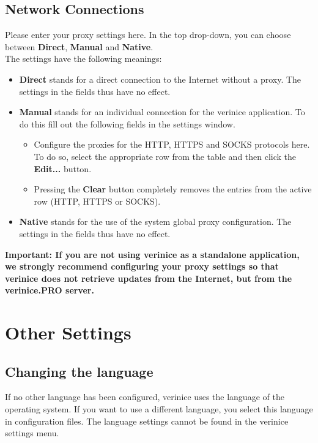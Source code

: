 \documentclass[a4paper,10pt]{book}
\begin{document}
\section{Network Connections}
Please enter your proxy settings here. In the top drop-down, you can choose between \textbf{Direct}, \textbf{Manual} and \textbf{Native}.
\newline\\
The settings have the following meanings:
\begin{itemize}
 \item \textbf{Direct} stands for a direct connection to the Internet without a proxy. The settings in the fields thus have no effect.
 \item \textbf{Manual} stands for an individual connection for the verinice application. To do this fill out the following fields in the settings window.
  \begin{itemize}
   \item Configure the proxies for the HTTP, HTTPS and SOCKS protocols here. To do so, select the appropriate row from the table and then click the \textbf{Edit...} button.
   \item Pressing the \textbf{Clear} button completely removes the entries from the active row (HTTP, HTTPS or SOCKS).
  \end{itemize}
 \item \textbf{Native} stands for the use of the system global proxy configuration. The settings in the fields thus have no effect.
\end{itemize}
\textbf{Important: If you are not using verinice as a standalone application, we strongly recommend configuring
your proxy settings so that verinice does not retrieve updates from the Internet, but from the
verinice.\textsc{PRO} server.}

\chapter{Other Settings}\label{chap:other-settings}
\section{Changing the language}
\label{sec:changing-language}

If no other language has been configured, verinice uses the language of the operating system. If you want to use a different language, you select this language in configuration files. The language settings cannot be found in the verinice settings menu.
\end{document}
